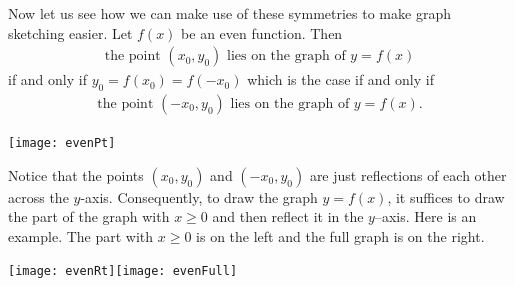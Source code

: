 Now let us see how we can make use of these symmetries to make graph sketching easier. Let
$f(x)$ be an even function. Then
\begin{align*}
\text{the point } (x_0,y_0)\text{ lies on the graph of }y=f(x)
\end{align*}
if and only if $y_0= f(x_0) = f(-x_0)$ which is the case if and only if
\begin{align*}
\text{the point }(-x_0,y_0)\text{ lies on the graph of }y=f(x).
\end{align*}
\begin{efig}
\begin{center}
   \texttt{[image: evenPt]}
\end{center}
\end{efig}
Notice that the points $(x_0,y_0)$ and $(-x_0,y_0)$ are just reflections of
each other across the $y$-axis. Consequently, to draw the graph $y=f(x)$, it suffices to
draw the part of the graph with $x\ge 0$ and then reflect it in the $y$--axis.
Here is an example. The part with $x\ge 0$ is on the left and the full graph is on the
right.
\begin{efig}
\begin{center}
   \texttt{[image: evenRt]}\qquad\texttt{[image: evenFull]}
\end{center}
\end{efig}


